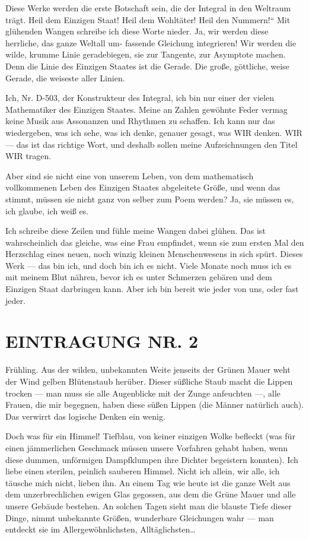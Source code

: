 Diese Werke werden die erste Botschaft sein, die der Integral in
den Weltraum trägt. Heil dem Einzigen Staat! Heil dem Wohltäter!
Heil den Nummern!“ Mit glühenden Wangen schreibe ich diese Worte
nieder. Ja, wir werden diese herrliche, das ganze Weltall um-
fassende Gleichung integrieren! Wir werden die wilde, krumme Linie
geradebiegen, sie zur Tangente, zur Asymptote machen. Denn die
Linie des Einzigen Staates ist die Gerade. Die große, göttliche,
weise Gerade, die weiseste aller Linien.

Ich, Nr. D-503, der Konstrukteur des Integral, ich bin nur einer
der vielen Mathematiker des Einzigen Staates. Meine an Zahlen
gewöhnte Feder vermag keine Musik aus Assonanzen und Rhythmen zu
schaffen. Ich kann nur das wiedergeben, was ich sehe, was ich
denke, genauer gesagt, was WIR denken. WIR — das ist das richtige
Wort, und deshalb sollen meine Aufzeichnungen den Titel WIR
tragen.

Aber sind sie nicht eine von unserem Leben, von dem mathematisch
vollkommenen Leben des Einzigen Staates abgeleitete Größe, und wenn
das stimmt, müssen sie nicht ganz von selber zum Poem werden? Ja,
sie müssen es, ich glaube, ich weiß es.

Ich schreibe diese Zeilen und fühle meine Wangen dabei glühen. Das
ist wahrscheinlich das gleiche, was eine Frau empfindet, wenn sie
zum ersten Mal den Herzschlag eines neuen, noch winzig kleinen
Menschenwesens in sich spürt. Dieses Werk — das bin ich, und doch
bin ich es nicht. Viele Monate noch muss ich es mit meinem Blut
nähren, bevor ich es unter Schmerzen gebären und dem Einzigen Staat
darbringen kann. Aber ich bin bereit wie jeder von uns, oder fast
jeder.

\section{EINTRAGUNG NR. 2}

Frühling. Aus der wilden, unbekannten Weite jenseits der Grünen
Mauer weht der Wind gelben Blütenstaub herüber. Dieser süßliche
Staub macht die Lippen trocken — man muss sie alle Augenblicke mit
der Zunge anfeuchten —, alle Frauen, die mir begegnen, haben diese
süßen Lippen (die Männer natürlich auch). Das verwirrt das logische
Denken ein wenig.

Doch was für ein Himmel! Tiefblau, von keiner einzigen Wolke
befleckt (was für einen jämmerlichen Geschmack müssen unsere
Vorfahren gehabt haben, wenn diese dummen, unförmigen Dampfklumpen
ihre Dichter begeistern konnten). Ich liebe einen sterilen,
peinlich sauberen Himmel. Nicht ich allein, wir alle, ich täusche
mich nicht, lieben ihn. An einem Tag wie heute ist die ganze Welt
aus dem unzerbrechlichen ewigen Glas gegossen, aus dem die Grüne
Mauer und alle unsere Gebäude bestehen. An solchen Tagen sieht man
die blauste Tiefe dieser Dinge, nimmt unbekannte Größen, wunderbare
Gleichungen wahr — man entdeckt sie im Allergewöhnlichsten,
Alltäglichsten\ldots{}

